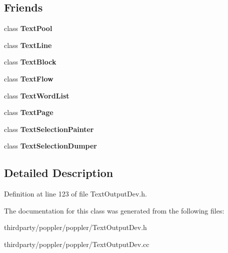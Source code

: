 \subsection*{Friends}
\begin{DoxyCompactItemize}
\item 
\mbox{\label{class_text_word_a3eb45334505d2b739c31f03ba83f6fc5}} 
class {\bfseries Text\+Pool}
\item 
\mbox{\label{class_text_word_a47df881e8259564a58fb3a0f656e1c98}} 
class {\bfseries Text\+Line}
\item 
\mbox{\label{class_text_word_a10941693a31766eabb041642470df529}} 
class {\bfseries Text\+Block}
\item 
\mbox{\label{class_text_word_a013da25b06e986abc9b0f46aa906eae8}} 
class {\bfseries Text\+Flow}
\item 
\mbox{\label{class_text_word_ab6d080596abe41783ce85827de349c49}} 
class {\bfseries Text\+Word\+List}
\item 
\mbox{\label{class_text_word_aabfaf949a35dc7fec076efc8f20054a8}} 
class {\bfseries Text\+Page}
\item 
\mbox{\label{class_text_word_a478e1ac9857fe7ba0b2079ce49d24e78}} 
class {\bfseries Text\+Selection\+Painter}
\item 
\mbox{\label{class_text_word_af2dbf093feb7a4386dbeeb5bf5423f29}} 
class {\bfseries Text\+Selection\+Dumper}
\end{DoxyCompactItemize}


\subsection{Detailed Description}


Definition at line 123 of file Text\+Output\+Dev.\+h.



The documentation for this class was generated from the following files\+:\begin{DoxyCompactItemize}
\item 
thirdparty/poppler/poppler/Text\+Output\+Dev.\+h\item 
thirdparty/poppler/poppler/Text\+Output\+Dev.\+cc\end{DoxyCompactItemize}
